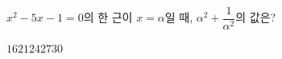 $x^2-5x-1=0$의 한 근이 $x=\alpha$일 때, $\alpha^2+\dfrac{1}{\alpha^2}$의 값은?
\begin{choices32}{$16$}{$21$}{$24$}{$27$}{$30$}\end{choices32}
